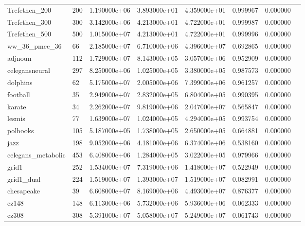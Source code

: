 \begin{tabular}{llrrrrrr}
Trefethen\_200           &  200 &  1.190000e+06 &  3.893000e+01 &  4.359000e+01 &  0.999967 &  0.000000 \\
Trefethen\_300           &  300 &  3.142000e+06 &  4.213000e+01 &  4.722000e+01 &  0.999987 &  0.000000 \\
Trefethen\_500           &  500 &  1.015000e+07 &  4.213000e+01 &  4.722000e+01 &  0.999996 &  0.000000 \\
ww\_36\_pmec\_36           &   66 &  2.185000e+07 &  6.710000e+06 &  4.396000e+07 &  0.692865 &  0.000000 \\
adjnoun                 &  112 &  1.729000e+07 &  8.143000e+05 &  3.057000e+06 &  0.952909 &  0.000000 \\
celegansneural          &  297 &  8.250000e+06 &  1.025000e+05 &  3.380000e+05 &  0.987573 &  0.000000 \\
dolphins                &   62 &  5.175000e+07 &  2.005000e+06 &  7.399000e+06 &  0.961257 &  0.000000 \\
football                &   35 &  2.949000e+07 &  2.832000e+05 &  6.804000e+05 &  0.990395 &  0.000000 \\
karate                  &   34 &  2.262000e+07 &  9.819000e+06 &  2.047000e+07 &  0.565847 &  0.000000 \\
lesmis                  &   77 &  1.639000e+07 &  1.024000e+05 &  4.294000e+05 &  0.993754 &  0.000000 \\
polbooks                &  105 &  5.187000e+05 &  1.738000e+05 &  2.650000e+05 &  0.664881 &  0.000000 \\
jazz                    &  198 &  9.052000e+06 &  4.181000e+06 &  6.374000e+06 &  0.538160 &  0.000000 \\
celegans\_metabolic      &  453 &  6.408000e+06 &  1.284000e+05 &  3.022000e+05 &  0.979966 &  0.000000 \\
grid1                   &  252 &  1.534000e+07 &  7.319000e+06 &  1.418000e+07 &  0.522949 &  0.000000 \\
grid1\_dual              &  224 &  1.519000e+07 &  1.393000e+07 &  1.519000e+07 &  0.082991 &  0.000000 \\
chesapeake              &   39 &  6.608000e+07 &  8.169000e+06 &  4.493000e+07 &  0.876377 &  0.000000 \\
cz148                   &  148 &  6.113000e+06 &  5.732000e+06 &  5.936000e+06 &  0.062333 &  0.000000 \\
cz308                   &  308 &  5.391000e+07 &  5.058000e+07 &  5.249000e+07 &  0.061743 &  0.000000 \\

\end{tabular}
